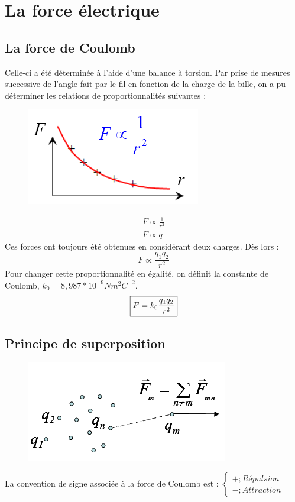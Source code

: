 \documentclass	[11pt, a4paper, openany]{book}
\begin{document}
\section{La force électrique}
\subsection{La force de Coulomb}
Celle-ci a été déterminée à l'aide d'une balance à torsion. Par prise de mesures successive de l'angle fait par le fil en fonction de la charge de la bille, on a pu déterminer les relations de proportionnalités suivantes :
\begin{figure}
\includegraphics[scale=0.44]{es/image1.png}
\end{figure}
\begin{eqnarray}
F \propto \frac{1}{r^2}\\
F \propto q
\end{eqnarray}
Ces forces ont toujours été obtenues en considérant deux charges. Dès lors :
\begin{equation}
F \propto \frac{q_1q_2}{r^2}
\end{equation}
Pour changer cette proportionnalité en égalité, on définit la constante de Coulomb, $k_0 = 8,987*10^{-9} Nm^2C^{-2}$.
\begin{equation}
\fbox{$ F = k_0 \dfrac{q_1q_2}{r^2}$}
\end{equation}

\subsection{Principe de superposition}
\begin{figure}
\includegraphics[scale=0.44]{es/image2.png}
\end{figure}
La convention de signe associée à la force de Coulomb est : $\left\{\begin{array}{l}
+ ; Répulsion\\
- ; Attraction
\end{array}\right.$\\
\end{document}
